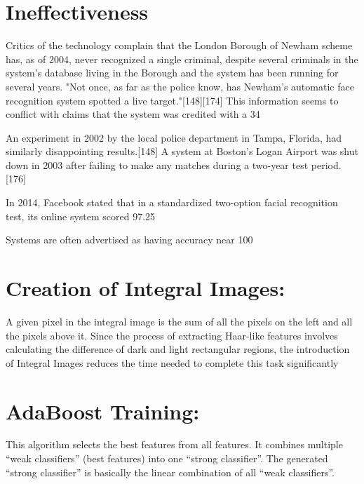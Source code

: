 \section{Ineffectiveness}
Critics of the technology complain that the London Borough of Newham scheme has, as of 2004, never recognized a single criminal, despite several criminals in the system's database living in the Borough and the system has been running for several years. "Not once, as far as the police know, has Newham's automatic face recognition system spotted a live target."[148][174] This information seems to conflict with claims that the system was credited with a 34%

An experiment in 2002 by the local police department in Tampa, Florida, had similarly disappointing results.[148] A system at Boston's Logan Airport was shut down in 2003 after failing to make any matches during a two-year test period.[176]

In 2014, Facebook stated that in a standardized two-option facial recognition test, its online system scored 97.25%

Systems are often advertised as having accuracy near 100%


\newpage
\section{Creation of Integral Images:}
A given pixel in the integral image is the sum of all the pixels on the left and all the pixels above it. Since the
process of extracting Haar-like features involves calculating the difference of dark and light rectangular regions, the
introduction of Integral Images reduces the time needed to complete this task significantly

\section{AdaBoost Training:}This algorithm selects the best features from all features. It combines multiple “weak classifiers” (best features) into
one “strong classifier”. The generated “strong classifier” is basically the linear combination of all “weak classifiers”.
